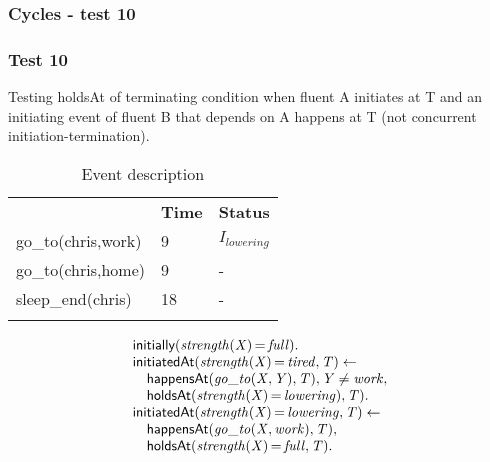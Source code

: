 \documentclass[8pt]{beamer}
\DeclareMathOperator{\val}{=}  %
\def \patsize {}
\def\happensAt{\textsf{\patsize happensAt}}
\def\initially{\textsf{\patsize initially}}
\def\holdsAt{\textsf{\patsize holdsAt}}
\def\initiatedAt{\textsf{\patsize initiatedAt}}
\newenvironment{mysplit}%
  {\arraycolsep 0pt \begin{array}{l}}%
  {\end{array}}
\begin{document}
\begin{frame}
    \frametitle{Cycles - test 10}
    \subsubsection{Test 10}
    \small
    Testing holdsAt of terminating condition when fluent A initiates at T and an initiating event of fluent B that depends on A happens at T (not concurrent initiation-termination).\linebreak
    \begin{minipage}{0.4\linewidth}
        \begin{table}[t!]
            \caption{Event description}
            \begin{center}

                \begin{tabular}{lll}
                    \hline\noalign{\smallskip}
                    \multicolumn{1}{l}{\textbf{Event}} & \multicolumn{1}{c}{\textbf{Time}} & \multicolumn{1}{c}{\textbf{Status}} \\
                    go\_to(chris,work)& 9 & $I_{lowering}$\\
                    go\_to(chris,home)& 9 & -\\
                    sleep\_end(chris)& 18 & -\\
                    \noalign{\smallskip}
                    \hline
                \end{tabular}
            \end{center}
        \end{table}
    \end{minipage}
    \begin{minipage}{0.55\linewidth}
        \begin{align*}
            \begin{mysplit}
                \initially\mathit{(strength(X)\val full)}.\\
                \initiatedAt\mathit{(strength(X)\val tired,T)\leftarrow}\\
                \quad    \happensAt\mathit{(go\_to(X,Y),T),Y\neq work,}\\
                \quad    \holdsAt\mathit{(strength(X)\val lowering),T).}\\
                \initiatedAt\mathit{(strength(X)\val lowering,T)\leftarrow}\\
                \quad    \happensAt\mathit{(go\_to(X,work),T),}\\
                \quad    \holdsAt\mathit{(strength(X)\val full,T).}\\

\end{mysplit}
\end{align*}
\end{minipage}
\end{frame}
\end{document}
